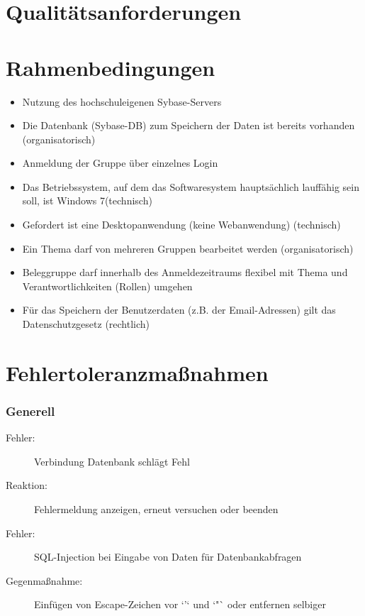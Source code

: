 \documentclass{article}
\begin{document}
\newpage
\part{Qualitätsanforderungen}

\newpage
\part{Rahmenbedingungen}
\begin{itemize}
\item Nutzung des hochschuleigenen Sybase-Servers
\item Die Datenbank (Sybase-DB) zum Speichern der Daten ist bereits vorhanden
(organisatorisch)
\item Anmeldung der Gruppe über einzelnes Login
\item Das Betriebssystem, auf dem das Softwaresystem hauptsächlich lauffähig
sein soll, ist Windows 7(technisch)
\item Gefordert ist eine Desktopanwendung (keine Webanwendung) (technisch)
\item Ein Thema darf von mehreren Gruppen bearbeitet werden (organisatorisch)
\item Beleggruppe darf innerhalb des Anmeldezeitraums flexibel mit Thema und Verantwortlichkeiten (Rollen) umgehen
\item Für das Speichern der Benutzerdaten (z.B. der Email-Adressen) gilt das
Datenschutzgesetz (rechtlich)
\end{itemize}

\newpage
\part{Fehlertoleranzmaßnahmen}

\section{Generell}
\begin{description}
\item[Fehler:] Verbindung Datenbank schlägt Fehl
\item[Reaktion:] Fehlermeldung anzeigen, erneut versuchen oder beenden
\end{description}

\begin{description}
\item[Fehler:] SQL-Injection bei Eingabe von Daten für Datenbankabfragen
\item[Gegenmaßnahme:] Einfügen von Escape-Zeichen vor `'` und `"` oder entfernen selbiger
\end{description}
\end{document}
